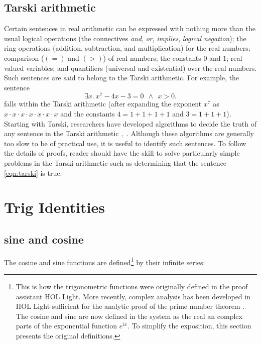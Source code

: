 \subsection{Tarski arithmetic}

\label{back:tarski}
  Certain sentences in real arithmetic can be expressed with nothing
  more than the usual logical operations (the connectives {\it and},
  {\it or}, {\it implies}, {\it logical negation}); the ring
  operations (addition, subtraction, and multiplication) for the real
  numbers; comparison ($(=)$ and $(>)$) of real numbers; the constants
  $0$ and $1$; real-valued variables; and quantifiers (universal and
  existential) over the real numbers.  Such sentences are said to
  belong to the Tarski arithmetic.  For example, the sentence
\begin{equation}\label{eqn:tarski}
\exists x.~x^7 - 4 x - 3 = 0 ~~\land~~ x > 0.
\end{equation}
falls within the Tarski arithmetic (after expanding the exponent $x^7$
as $x\cdot x\cdot x\cdot x\cdot x\cdot x\cdot x$ and the constants
$4=1+1+1+1$ and $3=1+1+1$).  Starting with Tarski, researchers have
developed algorithms to decide the truth of any sentence in the Tarski
arithmetic \cite{tarski-decision},~\cite{Mishra:1997}.  
Although these algorithms are generally too slow to be of practical
use, it is useful to identify such sentences.  To follow the details of proofs, 
reader should have the skill to solve particularly simple
problems in the Tarski arithmetic such as determining that the
sentence \eqref{eqn:tarski} is true.


\section{Trig Identities}


\subsection{sine and cosine}

The cosine and sine functions are defined\footnote{This is how the
  trigonometric functions were originally defined in the proof
  assistant HOL Light.  More recently, complex analysis has been
  developed in HOL Light sufficient for the analytic proof of
  the prime number theorem \cite{harrison:2009:pnt}.  The cosine and
  sine are now defined in the system as the real an complex parts of
  the exponential function $e^{i x}$.  To simplify the exposition, this section
  presents the original definitions.} by their infinite series:%




